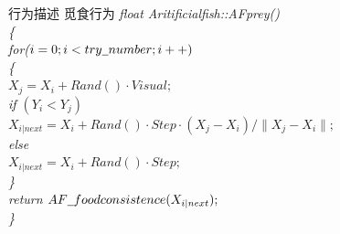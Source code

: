\documentclass[a4paper, 11pt]{article}
\begin{document}
\begin{section}
	\begin{subsection}
		{行为描述}
		\small{觅食行为}
			\flushleft\scriptsize{\emph{float Aritificial\underline{\hspace{0.5em}}fish::AF\underline{\hspace{0.5em}}prey()\\{\{}\\{\qquad for($i=0;i<try\underline{\hspace{0.5em}}number;i++)$}\\{\qquad\{}\\{\qquad\qquad$X_j=X_i+Rand()·Visual;$}\\{\qquad\qquad if $(Y_i<Y_j)$}\\{\qquad\qquad\qquad $X_{i|next}=X_i+Rand()·Step·(X_j-X_i)/\lVert X_j-X_i\rVert;$}\\{\qquad\qquad else}\\{\qquad\qquad\qquad $X_{i|next}=X_i+Rand()·Step;$}\\{\qquad\}}\\{ return $AF\underline{\hspace{0.5em}}foodconsistence(X_{i|next});$} \\{\}} }}\\

\end{subsection}
\end{section}
\end{document}

